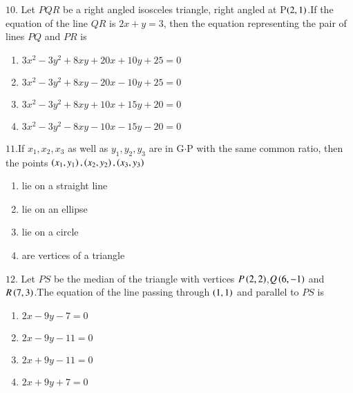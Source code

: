 \documentclass[journal,12pt,twocolumn]{IEEEtran}
\theoremstyle{remark}
\begin{document}
$10$. Let $PQR$ be a right angled isosceles triangle, right angled at P$\left(2,1\right)$.If the equation of the line $QR$ is $2x+y=3$, then the equation representing the pair of lines $PQ$ and $PR$ is \hfill{
\begin{enumerate}[label=(\alph*)]
    \item $3x^{2}-3y^{2}+8xy+20x+10y+25=0$
    \item $3x^{2}-3y^{2}+8xy-20x-10y+25=0$
    \item $3x^{2}-3y^{2}+8xy+10x+15y+20=0$
    \item $3x^{2}-3y^{2}-8xy-10x-15y-20=0$
\end{enumerate}
$11.$If $x_1,x_2,x_3$ as well as $y_1,y_2,y_3$ are in G$\cdot$P with the same common ratio, then the points $\left(x_1,y_1\right),\left(x_2,y_2\right),\left(x_3,y_3\right)$\hfill{}
\begin{enumerate}[label=(\alph*)]
    \item lie on a straight line
    \item lie on an ellipse
    \item lie on a circle 
    \item are vertices of a triangle
\end{enumerate}
$12.$ Let $PS$ be the median of the triangle with vertices $P\left(2,2\right)$,$Q\left(6,-1\right)$ and $R\left(7,3\right)$.The equation of the line passing through $\left(1,1\right)$ and parallel to $PS$ is \hfill{}
\begin{enumerate}[label=(\alph*)]
    \item $2x-9y-7=0$
    \item $2x-9y-11=0$
    \item $2x+9y-11=0$
    \item $2x+9y+7=0$


\end{enumerate}}
\end{document}
